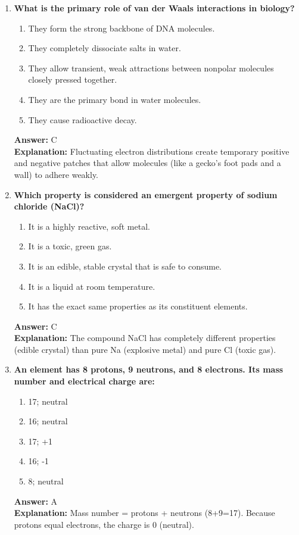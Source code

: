 \documentclass[11pt, a4paper]{article}
\begin{document}
\begin{enumerate}
\item \textbf{What is the primary role of van der Waals interactions in biology?}
\begin{enumerate}[label=\Alph*.]
    \item They form the strong backbone of DNA molecules.
    \item They completely dissociate salts in water.
    \item They allow transient, weak attractions between nonpolar molecules closely pressed together.
    \item They are the primary bond in water molecules.
    \item They cause radioactive decay.
\end{enumerate}
\textbf{Answer:} C \\
\textbf{Explanation:} Fluctuating electron distributions create temporary positive and negative patches that allow molecules (like a gecko's foot pads and a wall) to adhere weakly.

\item \textbf{Which property is considered an emergent property of sodium chloride (NaCl)?}
\begin{enumerate}[label=\Alph*.]
    \item It is a highly reactive, soft metal.
    \item It is a toxic, green gas.
    \item It is an edible, stable crystal that is safe to consume.
    \item It is a liquid at room temperature.
    \item It has the exact same properties as its constituent elements.
\end{enumerate}
\textbf{Answer:} C \\
\textbf{Explanation:} The compound NaCl has completely different properties (edible crystal) than pure Na (explosive metal) and pure Cl (toxic gas).

\item \textbf{An element has 8 protons, 9 neutrons, and 8 electrons. Its mass number and electrical charge are:}
\begin{enumerate}[label=\Alph*.]
    \item 17; neutral
    \item 16; neutral
    \item 17; +1
    \item 16; -1
    \item 8; neutral
\end{enumerate}
\textbf{Answer:} A \\
\textbf{Explanation:} Mass number = protons + neutrons (8+9=17). Because protons equal electrons, the charge is 0 (neutral).


\end{enumerate}
\end{document}

